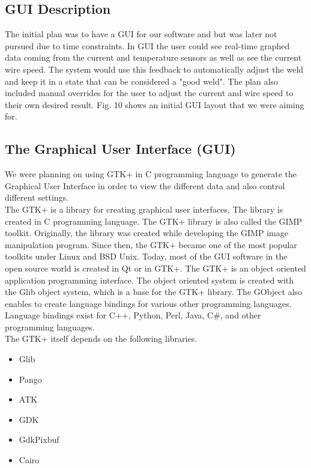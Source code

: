 \documentclass[12pt]{article}
\begin{document}
\clearpage


\subsection{GUI Description}

The initial plan was to have a GUI for our software and but was later not pursued due to time constraints. In GUI the user could see real-time graphed data coming from the current and temperature sensors as well as see the current wire speed. The system would use this feedback to automatically adjust the weld and keep it in a state that can be considered a "good weld". The plan also included manual overrides for the user to adjust the current and wire speed to their own desired result. Fig. 10 shows an initial GUI layout that we were aiming for.



\subsection{The Graphical User Interface (GUI)}

We were planning on using GTK+ in C programming language to generate the Graphical User Interface in order to view the different data and also control different settings.\\

The GTK+ is a library for creating graphical user interfaces. The library is created in C programming language. The GTK+ library is also called the GIMP toolkit. Originally, the library was created while developing the GIMP image manipulation program. Since then, the GTK+ became one of the most popular toolkits under Linux and BSD Unix. Today, most of the GUI software in the open source world is created in Qt or in GTK+. The GTK+ is an object oriented application programming interface. The object oriented system is created with the Glib object system, which is a base for the GTK+ library. The GObject also enables to create language bindings for various other programming languages. Language bindings exist for C++, Python, Perl, Java, C\#, and other programming languages.\\

The GTK+ itself depends on the following libraries.

\begin{itemize}

\item Glib
\item Pango
\item ATK
\item GDK
\item GdkPixbuf
\item Cairo



\end{itemize}
\end{document}
